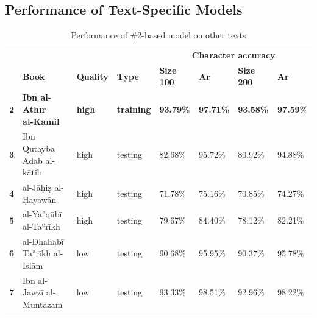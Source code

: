 \begin{subappendices}
\newpage
\section{Performance of Text-Specific Models}
	\label{app:perf_spec}
\begin{table}[H]
\begin{minipage}{\textwidth}
\begin{center}
\caption{Performance of \#2-based model on other texts}
\label{tab:soa_atab1}
\renewcommand*{\thefootnote}{\alph{footnote}}
\begin{tabularx}{\textwidth}{lp{2.2cm}XXXXXX} \toprule
& & & & \multicolumn{4}{c}{\textbf{Character accuracy}}\\
\cline{5-8}
& \textbf{Book}& \textbf{Quality} & \textbf{Type} & \textbf{Size 100} & \textbf{Ar}& \textbf{Size 200} & \textbf{Ar}\\\midrule
\textbf{2} & \textbf{Ibn al-Athīr \newline\scriptsize{al-Kāmil}} &  	  \textbf{high} & \textbf{training} & \textbf{93.79\%} & \textbf{97.71\%} & \textbf{93.58\%} & \textbf{97.59\%}\\
\textbf{3} & Ibn Qutayba \newline\scriptsize{Adab al-kātib} & high& testing	& 82.68\% & 95.72\% & 80.92\% & 94.88\% \\
\textbf{4} & al-Jāḥiẓ \newline\scriptsize{al-Ḥayawān} & 	  high& testing & 71.78\% & 75.16\% & 70.85\% & 74.27\%\\
\textbf{5} & al-Yaʿqūbī \newline\scriptsize{al-Taʿrīkh} & 	  high& testing & 79.67\% & 84.40\% & 78.12\% & 82.21\%\\
\textbf{6} & al-Dhahabī \newline\scriptsize{Taʾrīkh al-Islām}  & low& testing	& 90.68\% & 95.95\% & 90.37\% & 95.78\%\\
\textbf{7} & Ibn al-Jawzī \newline\scriptsize{al-Muntaẓam} &    low& testing & 93.33\% & 98.51\% & 92.96\% & 98.22\%\\
\bottomrule
\end{tabularx}
\end{center}
\end{minipage}
\end{table}


\end{subappendices}

